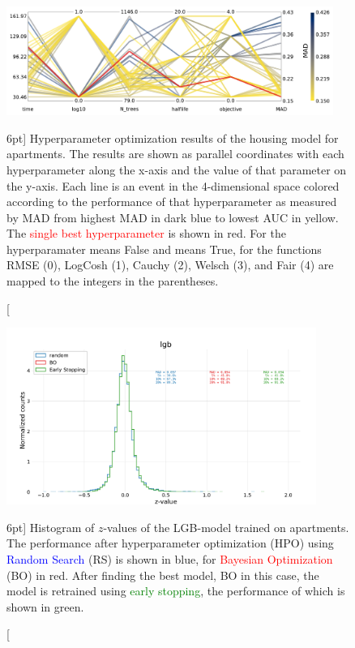 \documentclass[a4paper, twoside, nobib]{tufte-book}
\newcommand{\code}[1]{\colorbox{light-gray}{\texttt{\detokenize{#1}}}}
\begin{document}
\begin{figure}
  \includegraphics[width=0.95\textwidth, trim=0 0 0 0, clip]{figures/housing/Ejerlejlighed_v17_cut_all_Ncols_all_CV_viz_initial_HPO.pdf}
  \caption[Overview of initial hyperparamater optimization of the housing model for apartments][6pt]
          {Hyperparameter optimization results of the housing model for apartments. The results are shown as parallel coordinates with each hyperparameter along the x-axis and the value of that parameter on the y-axis. Each line is an event in the 4-dimensional space colored according to the performance of that hyperparameter as measured by MAD from \textcolor{viridis-dark}{highest} MAD in dark blue to \textcolor{viridis-light}{lowest} AUC in yellow. The \textcolor{red}{single best hyperparameter} is shown in red. For the hyperparamater \code{log10} \code{0} means False and \code{1} means True, for \code{objektive} the functions RMSE (0), LogCosh (1), Cauchy (2), Welsch (3), and Fair (4) are mapped to the integers in the parentheses.   
          } 
  \label{fig:h:CV_res_parallel_coords}
\end{figure}



\begin{figure}
  \includegraphics[width=0.9\textwidth, trim=0 0 0 70, clip]{figures/housing/Ejerlejlighed_v17_cut_all_Ncols_all_lgb_z_hist_metrics.pdf}
  \caption[Performance of LGB-model on apartment prices][6pt]
          {Histogram of $z$-values of the LGB-model trained on apartments. The performance after hyperparameter optimization (HPO) using \textcolor{blue}{Random Search} (RS) is shown in blue, for \textcolor{red}{Bayesian Optimization} (BO) in red. After finding the best model, BO in this case, the model is retrained using \textcolor{green}{early stopping}, the performance of which is shown in green.}
  \label{fig:h:performance_lgb}
\end{figure}
\end{document}
